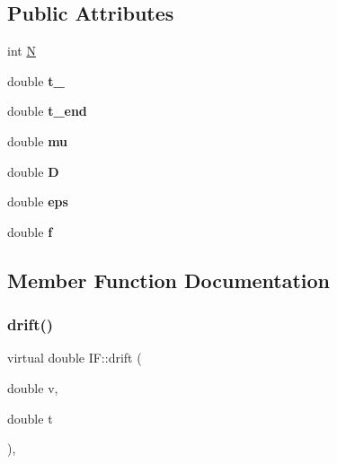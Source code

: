\subsection*{Public Attributes}
\begin{DoxyCompactItemize}
\item 
int \mbox{\hyperlink{classIF_aa81bddacf949214f2265214d7174f4c2}{N}}
\item 
\mbox{\label{classIF_ab9ff14c2b3690db446567d26cdf21540}} 
double {\bfseries t\+\_}
\item 
\mbox{\label{classIF_a2c512964adfc0421306b655ba3c85d3d}} 
double {\bfseries t\+\_\+end}
\item 
\mbox{\label{classIF_a9f690c993d7b7cd0095e26607503db72}} 
double {\bfseries mu}
\item 
\mbox{\label{classIF_a7e0fdbf32975dba0acf8096524885639}} 
double {\bfseries D}
\item 
\mbox{\label{classIF_aa91a852e6ea237c13679ecc65a9931d6}} 
double {\bfseries eps}
\item 
\mbox{\label{classIF_a26cf73a30be35c3e8a80e2a2f8e739f9}} 
double {\bfseries f}
\end{DoxyCompactItemize}


\subsection{Member Function Documentation}
\mbox{\label{classIF_a9bbd53df68cb9028bf87cf5273253e91}} 
\subsubsection{\texorpdfstring{drift()}{drift()}}
{\footnotesize\ttfamily virtual double I\+F\+::drift (\begin{DoxyParamCaption}\item[{double}]{v,  }\item[{double}]{t }\end{DoxyParamCaption})\hspace{0.3cm}{\ttfamily [inline]}, {\ttfamily [virtual]}}


